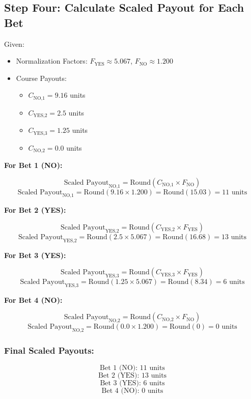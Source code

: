 \documentclass{article}
\begin{document}
\subsection*{Step Four: Calculate Scaled Payout for Each Bet}

Given:
\begin{itemize}
    \item Normalization Factors: \( F_{\text{YES}} \approx 5.067 \), \( F_{\text{NO}} \approx 1.200 \)
    \item Course Payouts:
    \begin{itemize}
        \item \( C_{\text{NO,1}} = 9.16 \) units
        \item \( C_{\text{YES,2}} = 2.5 \) units
        \item \( C_{\text{YES,3}} = 1.25 \) units
        \item \( C_{\text{NO,2}} = 0.0 \) units
    \end{itemize}
\end{itemize}

\textbf{For Bet 1 (NO):}

\[
\text{Scaled Payout}_{\text{NO,1}} = \text{Round}(C_{\text{NO,1}} \times F_{\text{NO}})
\]
\[
\text{Scaled Payout}_{\text{NO,1}} = \text{Round}(9.16 \times 1.200) = \text{Round}(15.03) = 11 \text{ units}
\]

\textbf{For Bet 2 (YES):}

\[
\text{Scaled Payout}_{\text{YES,2}} = \text{Round}(C_{\text{YES,2}} \times F_{\text{YES}})
\]
\[
\text{Scaled Payout}_{\text{YES,2}} = \text{Round}(2.5 \times 5.067) = \text{Round}(16.68) = 13 \text{ units}
\]

\textbf{For Bet 3 (YES):}

\[
\text{Scaled Payout}_{\text{YES,3}} = \text{Round}(C_{\text{YES,3}} \times F_{\text{YES}})
\]
\[
\text{Scaled Payout}_{\text{YES,3}} = \text{Round}(1.25 \times 5.067) = \text{Round}(8.34) = 6 \text{ units}
\]

\textbf{For Bet 4 (NO):}

\[
\text{Scaled Payout}_{\text{NO,2}} = \text{Round}(C_{\text{NO,2}} \times F_{\text{NO}})
\]
\[
\text{Scaled Payout}_{\text{NO,2}} = \text{Round}(0.0 \times 1.200) = \text{Round}(0) = 0 \text{ units}
\]

\subsubsection*{Final Scaled Payouts:}
\[
\text{Bet 1 (NO): } 11 \text{ units}
\]
\[
\text{Bet 2 (YES): } 13 \text{ units}
\]
\[
\text{Bet 3 (YES): } 6 \text{ units}
\]
\[
\text{Bet 4 (NO): } 0 \text{ units}
\]
\end{document}
